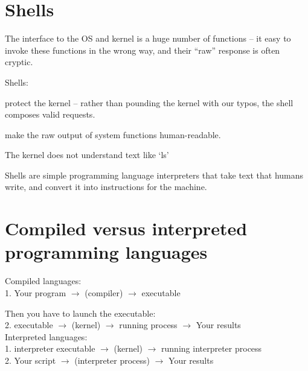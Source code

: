 \documentclass[landscape]{foils}
\begin{document}
\myNewSlide
\section*{Shells}
The interface to the OS and kernel is a huge number of functions -- it easy to invoke these functions in the wrong way, and their ``raw'' response is often cryptic.

Shells:
\begin{compactenum}	
	\item protect the kernel  -- rather than pounding the kernel with our typos, the shell composes valid requests.
	\item make the raw output of system functions human-readable.
\end{compactenum}	

The kernel does not understand text like `ls'

Shells are simple programming language interpreters that take text that humans write, and convert it into instructions for the machine.
\myNewSlide
\section*{Compiled versus interpreted programming languages}
\large
Compiled languages:\\
1. {\color{red} Your program} $\rightarrow$ (compiler) $\rightarrow$ executable\par
Then you have to launch the executable:\\
2. executable $\rightarrow$ (kernel) $\rightarrow$ running process $\rightarrow$ {\color{red} Your results}\\

Interpreted languages:\\
1. interpreter executable $\rightarrow$ (kernel) $\rightarrow$ running interpreter process\\
2. {\color{red} Your script}  $\rightarrow$ (interpreter process) $\rightarrow$ {\color{red} Your results}
\end{document}
